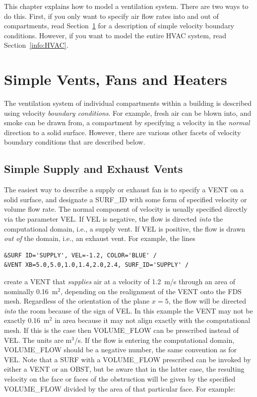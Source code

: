 \documentclass[11pt]{book}
\begin{document}
This chapter explains how to model a ventilation system. There are two ways to do this. First, if you only want to specify air flow rates into and out of
compartments, read Section~\ref{info:Velocity_BC} for a description of simple velocity boundary conditions. However, if you want to
model the entire HVAC system, read Section~\ref{info:HVAC}.


\section{Simple Vents, Fans and Heaters}
\label{info:Velocity_BC}

The ventilation system of individual compartments within a building is described using
velocity {\em boundary conditions}. For example, fresh air can be blown into, and smoke can
be drawn from, a compartment by specifying a velocity in the {\em normal} direction to a solid
surface. However, there are various other facets of velocity boundary conditions that are described below.

\subsection{Simple Supply and Exhaust Vents}

The easiest way to describe a supply or exhaust fan is to specify a {\ct VENT} on a solid surface, and designate
a {\ct SURF\_ID} with some form of specified velocity or volume flow rate.
The normal component of velocity is usually specified directly via the parameter
{\ct VEL}. If {\ct VEL} is negative, the flow is directed {\em into} the
computational domain, i.e., a supply vent. If {\ct VEL} is positive, the flow is drawn {\em out of} the
domain, i.e., an exhaust vent. For example, the lines

\begin{lstlisting}
&SURF ID='SUPPLY', VEL=-1.2, COLOR='BLUE' /
&VENT XB=5.0,5.0,1.0,1.4,2.0,2.4, SURF_ID='SUPPLY' /
\end{lstlisting}

\noindent
create a {\ct VENT} that {\em supplies} air at a velocity of 1.2~m/s through an area of nominally 0.16~m$^2$, depending on the
realignment of the {\ct VENT} onto the FDS mesh. Regardless of the
orientation of the plane $x=5$, the flow will be directed {\em into} the room because of the sign of {\ct VEL}.
In this example the {\ct VENT} may not be exactly
0.16~m$^2$ in area because it may not align exactly with the computational mesh. If this is the case then
{\ct VOLUME\_FLOW} can be prescribed instead of {\ct VEL}. The units
are m$^3$/s. If the flow is entering the computational domain, {\ct VOLUME\_FLOW}
should be a negative number, the same convention as for {\ct VEL}. Note that a {\ct SURF}
with a {\ct VOLUME\_FLOW} prescribed can be invoked by either a
{\ct VENT} or an {\ct OBST}, but be aware that in the latter case, the resulting
velocity on the face or faces of the obstruction will be given by the specified
{\ct VOLUME\_FLOW} divided by the area of that particular face. For example:
\end{document}

